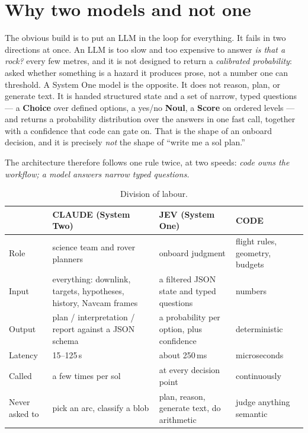 \documentclass[11pt]{article}
\newcommand{\rowrule}{\arrayrulecolor{black!22}\midrule\arrayrulecolor{black}}
\begin{document}
\section{Why two models and not one}

The obvious build is to put an LLM in the loop for everything. It fails in two directions at once. An LLM is too slow and too expensive to answer \emph{is that a rock?} every few metres, and it is not designed to return a \emph{calibrated probability}: asked whether something is a hazard it produces prose, not a number one can threshold. A System One model is the opposite. It does not reason, plan, or generate text. It is handed structured state and a set of narrow, typed questions --- a \textbf{Choice} over defined options, a yes/no \textbf{Noul}, a \textbf{Score} on ordered levels --- and returns a probability distribution over the answers in one fast call, together with a confidence that code can gate on. That is the shape of an onboard decision, and it is precisely \emph{not} the shape of ``write me a sol plan.''

The architecture therefore follows one rule twice, at two speeds: \emph{code owns the workflow; a model answers narrow typed questions.}

\begin{table}[h]
\centering\small
\begin{tabular}{@{}p{2.2cm}p{4.2cm}p{4.2cm}p{3.6cm}@{}}
\toprule
 & \textcolor{claude}{\textbf{CLAUDE} (System Two)} & \textcolor{jev}{\textbf{JEV} (System One)} & \textcolor{code}{\textbf{CODE}} \\
\midrule
Role & science team and rover planners & onboard judgment & flight rules, geometry, budgets \\
\rowrule
Input & everything: downlink, targets, hypotheses, history, Navcam frames & a filtered JSON state and typed questions & numbers \\
\rowrule
Output & plan / interpretation / report against a JSON schema & a probability per option, plus confidence & deterministic \\
\rowrule
Latency & 15--125\,s & about 250\,ms & microseconds \\
\rowrule
Called & a few times per sol & at every decision point & continuously \\
\rowrule
Never asked to & pick an arc, classify a blob & plan, reason, generate text, do arithmetic & judge anything semantic \\
\bottomrule
\end{tabular}
\caption{Division of labour.}
\end{table}
\end{document}
